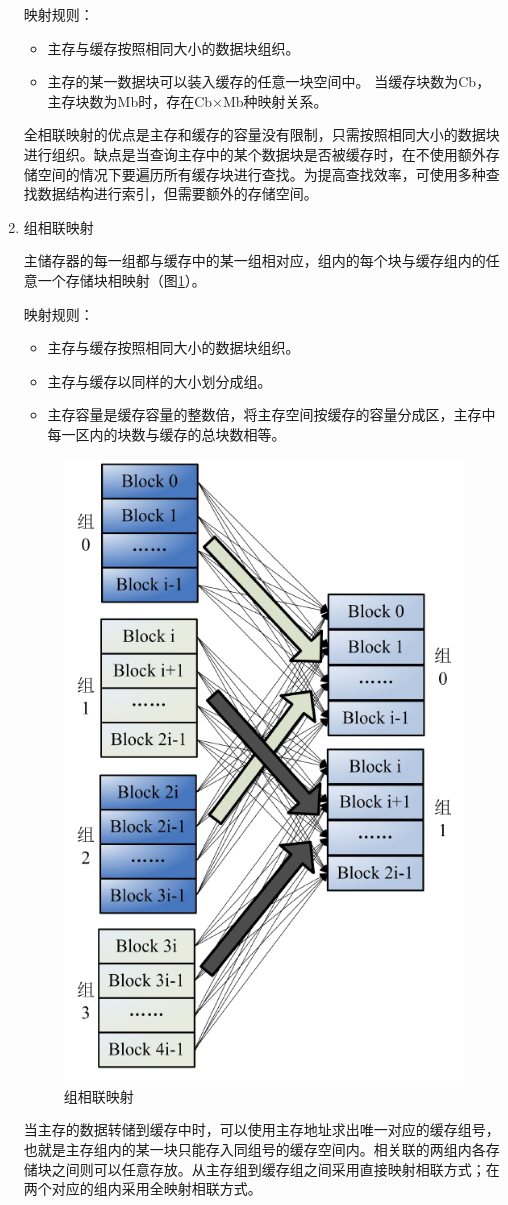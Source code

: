 \begin{enumerate}
映射规则：
\begin{itemize}
\item 主存与缓存按照相同大小的数据块组织。
\item 主存的某一数据块可以装入缓存的任意一块空间中。
当缓存块数为Cb，主存块数为Mb时，存在Cb×Mb种映射关系。
\end{itemize}

全相联映射的优点是主存和缓存的容量没有限制，只需按照相同大小的数据块进行组织。缺点是当查询主存中的某个数据块是否被缓存时，在不使用额外存储空间的情况下要遍历所有缓存块进行查找。为提高查找效率，可使用多种查找数据结构进行索引，但需要额外的存储空间。

\item 组相联映射

主储存器的每一组都与缓存中的某一组相对应，组内的每个块与缓存组内的任意一个存储块相映射（图\ref{fig:cache-map-3}）。

映射规则：
\begin{itemize}
\item 主存与缓存按照相同大小的数据块组织。
\item 主存与缓存以同样的大小划分成组。
\item 主存容量是缓存容量的整数倍，将主存空间按缓存的容量分成区，主存中每一区内的块数与缓存的总块数相等。
\end{itemize}

\begin{figure}[H]
\centering
\includegraphics[width=0.4\linewidth]{./graph/cache-map-3}
\caption{组相联映射}
\label{fig:cache-map-3}
\end{figure}

当主存的数据转储到缓存中时，可以使用主存地址求出唯一对应的缓存组号，也就是主存组内的某一块只能存入同组号的缓存空间内。相关联的两组内各存储块之间则可以任意存放。从主存组到缓存组之间采用直接映射相联方式；在两个对应的组内采用全映射相联方式。

\end{enumerate}

